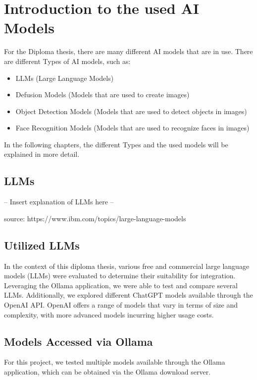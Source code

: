 \chapter{Introduction to the used AI Models}
\label{cha:Introduction_to_the_used_AI_Models}

For the Diploma thesis, there are many different AI models that are in use. There are different Types of AI models, such as:
\begin{itemize}
    \item LLMs (Large Language Models)
    \item Defusion Models (Models that are used to create images)
    \item Object Detection Models (Models that are used to detect objects in images)
    \item Face Recognition Models (Models that are used to recognize faces in images)
\end{itemize}

In the following chapters, the different Types and the used models will be explained in more detail.

\section{LLMs}

-- Insert explanation of LLMs here --

source: https://www.ibm.com/topics/large-language-models

\section{Utilized LLMs}

In the context of this diploma thesis, various free and commercial large language models (LLMs) 
were evaluated to determine their suitability for integration. Leveraging the Ollama application, 
we were able to test and compare several LLMs. Additionally, we explored different ChatGPT models available through the OpenAI API.
OpenAI offers a range of models that vary in terms of size and complexity, with more advanced models incurring higher usage costs.

\cite{OpenAI_API_overview}
\cite{WhatisOllama}

\section{Models Accessed via Ollama}

For this project, we tested multiple models available through the Ollama application, 
which can be obtained via the Ollama download server.

